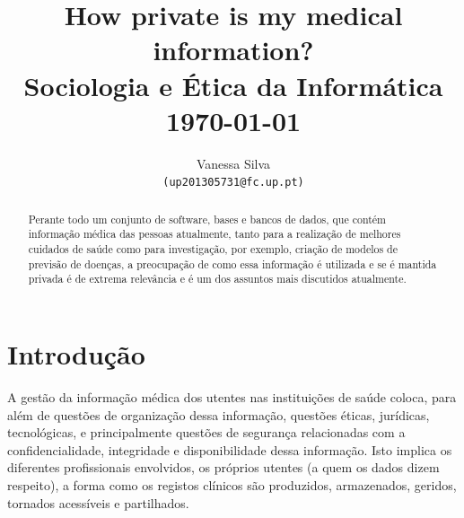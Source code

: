 \documentclass[conference]{IEEEtran}
\begin{document}
%
%

\title{How private is my medical information?\\
	\vspace*{10pt} \large Sociologia e Ética da Informática\\
		\normalsize \today{} }
%
\author{Vanessa Silva\\
	{\texttt{(up201305731@fc.up.pt)}}\\
}

\maketitle



\begin{abstract}

Perante todo um conjunto de software, bases e bancos de dados, que contém informação médica das pessoas atualmente, tanto para a realização de melhores cuidados de saúde como para investigação, por exemplo, criação de modelos de previsão de doenças, a preocupação de como essa informação é utilizada e se é mantida privada é de extrema relevância e é um dos assuntos mais discutidos atualmente.

\end{abstract}



\IEEEpeerreviewmaketitle


\section{Introdução}

A gestão da informação médica dos utentes nas instituições de saúde coloca, para além de questões de organização dessa informação, questões éticas, jurídicas, tecnológicas, e principalmente questões de segurança relacionadas com a confidencialidade, integridade e disponibilidade dessa informação.
Isto implica os diferentes profissionais envolvidos, os próprios utentes (a quem os dados dizem respeito), a forma como os registos clínicos são produzidos, armazenados, geridos, tornados acessíveis e partilhados.
\end{document}
